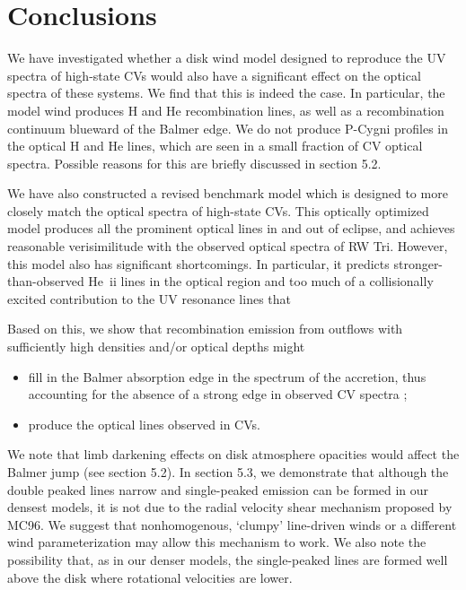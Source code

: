\documentclass[preprint, a4paper, 11pt]{aastex}
\begin{document}
\newpage




%
%


\section{Conclusions}

We have investigated whether a disk wind model designed to reproduce
the UV spectra of high-state CVs would also have a significant effect
on the optical spectra of these systems. We find that this is indeed
the case. In particular, the model wind produces H and He
recombination lines, as well as a recombination continuum blueward of
the Balmer edge. We do not produce P-Cygni profiles
in the optical H and He lines, 
which are seen in a small fraction of CV optical spectra.
Possible reasons for this are briefly discussed in section 
5.2.

We have also constructed a revised benchmark model which is designed
to more closely match the optical spectra of high-state CVs. This
optically optimized model produces all the prominent optical lines in
and out of eclipse, and achieves reasonable verisimilitude with the
observed optical spectra of RW Tri. However, this model also has
significant shortcomings. In particular, it predicts
stronger-than-observed He~{\sc ii} lines in the optical region and too
much of a collisionally excited contribution to the UV resonance lines
that  

Based on this, we show that recombination emission 
from outflows with sufficiently high densities and/or optical depths might 

\renewcommand{\labelitemi}{$\bullet$}
\begin{itemize}
	\item fill in the Balmer absorption edge in the spectrum of
          the accretion, thus accounting for the absence of a strong edge in
          observed CV spectra \citep{KLWB98};
	\item produce the optical lines observed in CVs.
\end{itemize}
\smallskip

We note that limb darkening effects on disk atmosphere opacities
would affect the Balmer jump (see section 5.2). In section 5.3, we demonstrate that
although the double peaked lines narrow and 
single-peaked emission can be formed in our densest models, 
it is not due to the radial velocity shear mechanism proposed by MC96.
We suggest that nonhomogenous, `clumpy' line-driven winds or a different
wind parameterization may allow this mechanism to work.
We also note the possibility that, as in our denser models, 
the single-peaked lines are formed well above the disk where 
rotational velocities are lower.
\end{document}
